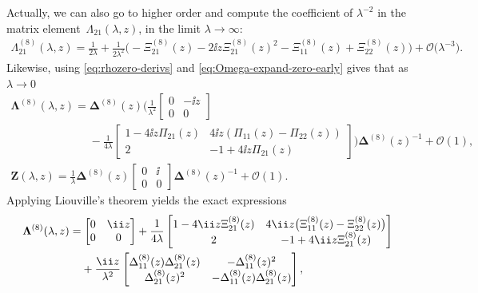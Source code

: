 Actually, we can also go to higher order and compute the coefficient of $\lambda^{-2}$ in the matrix element~$\Lambda_{21}(\lambda,z)$,
in the limit $\lambda\to\infty$:
\begin{align}
\Lambda_{21}^{(8)}(\lambda,z)=\frac{1}{2\lambda} +\frac{1}{2\lambda^2}\bigl(-\Xi_{21}^{(8)}(z)-{2\ii z}{}\Xi_{21}^{(8)}(z)^2-\Xi_{11}^{(8)}(z)+\Xi_{22}^{(8)}(z)\bigr)
+\mathcal{O}\big(\lambda^{-3}\big).
 \label{eq:Lambda21-higher-order}
\end{align}
Likewise, using \eqref{eq:rhozero-derivs} and \eqref{eq:Omega-expand-zero-early} gives that as $\lambda \to 0$
\begin{gather}
 \mathbf{\Lambda}^{(8)}(\lambda,z)=\mathbf{\Delta}^{(8)}(z)\Bigg(\frac{1}{\lambda^2}\begin{bmatrix}0&{-\ii z}{} \\0&0\end{bmatrix}\nonumber \\ \phantom{\mathbf{\Lambda}^{(8)}(\lambda,z)=}{}-\frac{1}{4\lambda}\begin{bmatrix}1-{4\ii z}\Pi_{21}(z)&{4\ii z}{}(\Pi_{11}(z)-\Pi_{22}(z))\\2&-1+{4\ii z}\Pi_{21}(z)\end{bmatrix}\Bigg)\mathbf{\Delta}^{(8)}(z)^{-1}
+ \mathcal{O}(1),\nonumber
 \\
 \mathbf{Z}(\lambda,z)=\frac{1}{\lambda}\mathbf{\Delta}^{(8)}(z)\begin{bmatrix}0&{\ii}{} \\0&0\end{bmatrix}\mathbf{\Delta}^{(8)}(z)^{-1} + \mathcal{O}(1).
\label{eq:Lax-coefficients-zero}
\end{gather}
Applying Liouville's theorem yields the exact expressions
\begin{align}
 & \mathbf{\Lambda}^{(8)}(\lambda,z)= \begin{bmatrix}0&{\ii z}{} \\0&0\end{bmatrix} +\frac{1}{4\lambda}\begin{bmatrix}1-{4\ii z}\Xi^{(8)}_{21}(z) & {4\ii z}{}\big(\Xi^{(8)}_{11}(z)-\Xi^{(8)}_{22}(z)\big) \\ 2 &-1 +{4\ii z}{}\Xi^{(8)}_{21}(z)\end{bmatrix}\nonumber
 \\
 &\hphantom{\mathbf{\Lambda}^{(8)}(\lambda,z)= }{}
 +\frac{\ii z}{\lambda^2}\begin{bmatrix}\Delta^{(8)}_{11}(z)\Delta^{(8)}_{21}(z) & -\Delta^{(8)}_{11}(z)^2 \\
 \Delta^{(8)}_{21}(z)^2 & -\Delta^{(8)}_{11}(z)\Delta^{(8)}_{21}(z)\end{bmatrix},
\label{eq:Lambda-exact}
\end{align}
